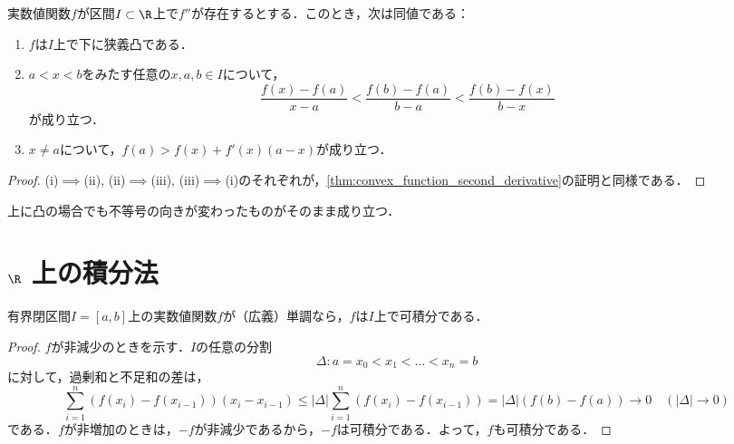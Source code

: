 \documentclass[a4paper,10pt]{ltjsarticle}
\begin{document}
\begin{MyCorollary}
  実数値関数\(f\)が区間\(I \subset \R\)上で\(f''\)が存在するとする．このとき，次は同値である：
  \begin{enumerate}
    \item \(f\)は\(I\)上で下に狭義凸である．
    \item \(a < x < b\)をみたす任意の\(x, a, b \in I\)について，
          \[ \frac{f(x) - f(a)}{x - a} < \frac{f(b) - f(a)}{b - a} < \frac{f(b) - f(x)}{b - x} \]
          が成り立つ．
    \item \(x \ne a\)について，\(f(a) > f(x) + f'(x)(a - x)\)が成り立つ．
  \end{enumerate}
\end{MyCorollary}
\begin{proof}
  (i)\(\implies\)(ii), (ii)\(\implies\)(iii), (iii)\(\implies\)(i)のそれぞれが，\cref{thm:convex_function_second_derivative}の証明と同様である．
\end{proof}

上に凸の場合でも不等号の向きが変わったものがそのまま成り立つ．

\section{\texorpdfstring{\(\R\)}{R} 上の積分法}
\label{sec:integral_R}

\begin{MyTheorem}
\end{MyTheorem}

\begin{MyTheorem}
  有界閉区間\(I = [a, b]\)上の実数値関数\(f\)が（広義）単調なら，\(f\)は\(I\)上で可積分である．
\end{MyTheorem}
\begin{proof}
  \(f\)が非減少のときを示す．\(I\)の任意の分割
  \[ \Delta : a = x_0 < x_1 < \dots < x_n = b \]
  に対して，過剰和と不足和の差は，
  \[ \sum_{i = 1}^n (f(x_i) - f(x_{i-1}))(x_i - x_{i-1}) \le |\Delta|\sum_{i=1}^n (f(x_i) - f(x_{i-1})) = |\Delta|(f(b) - f(a)) \to 0 \quad (|\Delta| \to 0) \]
  である．\(f\)が非増加のときは，\(-f\)が非減少であるから，\(-f\)は可積分である．よって，\(f\)も可積分である．
\end{proof}
\end{document}
